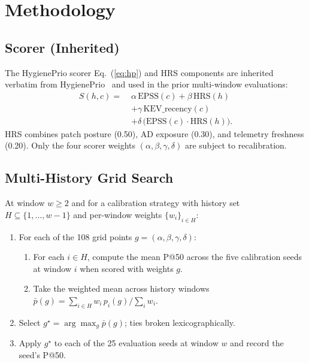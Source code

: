 \section{Methodology}

\subsection{Scorer (Inherited)}

The HygienePrio scorer Eq.~(\ref{eq:hp}) and HRS components are
inherited verbatim from HygienePrio~\cite{paper4hygieneprio} and used in
the prior multi-window evaluations:
\begin{equation}
\begin{aligned}
S(h,c) =\;& \alpha\,\mathrm{EPSS}(c) + \beta\,\mathrm{HRS}(h) \\
          & + \gamma\,\mathrm{KEV\_recency}(c) \\
          & + \delta\,\bigl(\mathrm{EPSS}(c) \cdot \mathrm{HRS}(h)\bigr).
\end{aligned}
\label{eq:hp}
\end{equation}
HRS combines patch posture (0.50), AD exposure (0.30), and telemetry
freshness (0.20). Only the four scorer weights $(\alpha, \beta, \gamma,
\delta)$ are subject to recalibration.

\subsection{Multi-History Grid Search}

At window $w \geq 2$ and for a calibration strategy with history set
$H \subseteq \{1, \ldots, w-1\}$ and per-window weights $\{w_i\}_{i \in H}$:
\begin{enumerate}
\item For each of the 108 grid points $g = (\alpha, \beta, \gamma,
\delta)$:
\begin{enumerate}
\item For each $i \in H$, compute the mean P@50 across the five
calibration seeds at window $i$ when scored with weights $g$.
\item Take the weighted mean across history windows
$\bar{p}(g) = \sum_{i \in H} w_i\, p_i(g) / \sum_i w_i$.
\end{enumerate}
\item Select $g^\star = \arg\max_g \bar{p}(g)$; ties broken lexicographically.
\item Apply $g^\star$ to each of the 25 evaluation seeds at window $w$
and record the seed's P@50.
\end{enumerate}


